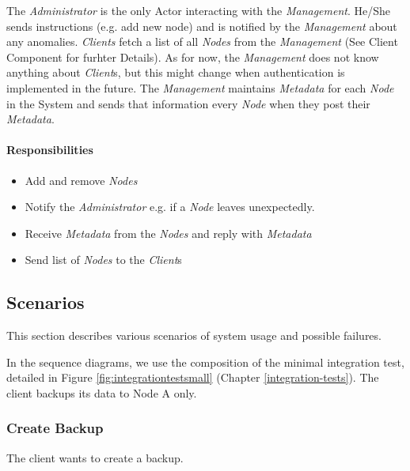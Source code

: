 The \emph{Administrator} is the only Actor interacting with the \emph{Management}. He/She sends instructions (e.g. add new node) and is notified by the \emph{Management} about any anomalies.
\emph{Clients} fetch a list of all \emph{Nodes} from the \emph{Management} (See Client Component for furhter Details). As for now, the \emph{Management} does not know anything about \emph{Client}s, but this might change when authentication is implemented in the future.
The \emph{Management} maintains \emph{Metadata} for each \emph{Node} in the System and sends that information every \emph{Node} when they post their \emph{Metadata}.

\paragraph{Responsibilities}
\begin{itemize}
	\item Add and remove \emph{Nodes}
	\item Notify the \emph{Administrator} e.g. if a \emph{Node} leaves unexpectedly.
	\item Receive \emph{Metadata} from the \emph{Nodes} and reply with \emph{Metadata}
	\item Send list of \emph{Nodes} to the \emph{Client}s
\end{itemize}

\subsection{Scenarios}
\label{sec:scenarios}
This section describes various scenarios of system usage and possible failures.

In the sequence diagrams, we use the composition of the minimal integration test, detailed in Figure \ref{fig:integrationtestsmall} (Chapter \ref{integration-tests}). The client backups its data to Node A only.

\subsubsection{Create Backup}\label{sec:scenario-create-backup}
The client wants to create a backup.

